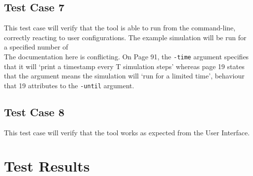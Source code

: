 \documentclass[11pt]{article}
\begin{document}
\subsection{Test Case 7}
This test case will verify that the tool is able to run from the command-line, correctly reacting to user configurations.
The example simulation will be run for a specified number of 
\\
The documentation here is conflicting. On Page 91, the \texttt{-time} argument specifies that it will `print a timestamp every T simulation steps' whereas page 19 states that the argument means the simulation will `run for a limited time', behaviour that 19 attributes to the \texttt{-until} argument.

\subsection{Test Case 8}
This test case will verify that the tool works as expected from the User Interface.

\newpage
\section{Test Results}%
\end{document}

